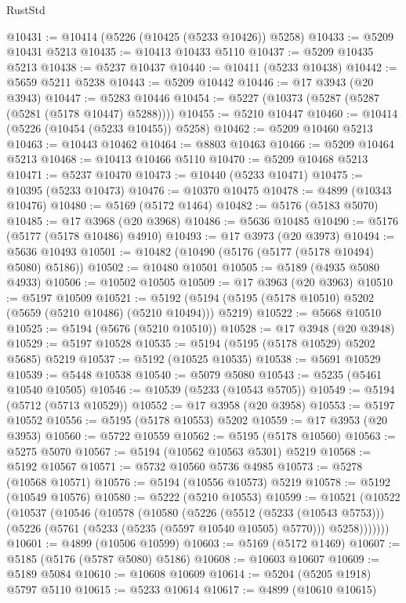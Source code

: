 \begin{lexlean}{RustStd}
\begin{coremodule}
@10431 := @10414 (@5226 (@10425 (@5233 @10426)) @5258)
@10433 := @5209 @10431 @5213
@10435 := @10413 @10433 @5110
@10437 := @5209 @10435 @5213
@10438 := @5237 @10437
@10440 := @10411 (@5233 @10438)
@10442 := @5659 @5211 @5238
@10443 := @5209 @10442
@10446 := @17 @3943 (@20 @3943)
@10447 := @5283 @10446
@10454 := @5227 (@10373 (@5287 (@5287 (@5281 (@5178 @10447) @5288))))
@10455 := @5210 @10447
@10460 := @10414 (@5226 (@10454 (@5233 @10455)) @5258)
@10462 := @5209 @10460 @5213
@10463 := @10443 @10462
@10464 := @8803 @10463
@10466 := @5209 @10464 @5213
@10468 := @10413 @10466 @5110
@10470 := @5209 @10468 @5213
@10471 := @5237 @10470
@10473 := @10440 (@5233 @10471)
@10475 := @10395 (@5233 @10473)
@10476 := @10370 @10475
@10478 := @4899 (@10343 @10476)
@10480 := @5169 (@5172 @1464)
@10482 := @5176 (@5183 @5070)
@10485 := @17 @3968 (@20 @3968)
@10486 := @5636 @10485
@10490 := @5176 (@5177 (@5178 @10486) @4910)
@10493 := @17 @3973 (@20 @3973)
@10494 := @5636 @10493
@10501 := @10482 (@10490 (@5176 (@5177 (@5178 @10494) @5080) @5186))
@10502 := @10480 @10501
@10505 := @5189 (@4935 @5080 @4933)
@10506 := @10502 @10505
@10509 := @17 @3963 (@20 @3963)
@10510 := @5197 @10509
@10521 := @5192 (@5194 (@5195 (@5178 @10510) @5202 (@5659 (@5210 @10486) (@5210 @10494))) @5219)
@10522 := @5668 @10510
@10525 := @5194 (@5676 (@5210 @10510))
@10528 := @17 @3948 (@20 @3948)
@10529 := @5197 @10528
@10535 := @5194 (@5195 (@5178 @10529) @5202 @5685) @5219
@10537 := @5192 (@10525 @10535)
@10538 := @5691 @10529
@10539 := @5448 @10538
@10540 := @5079 @5080
@10543 := @5235 (@5461 @10540 @10505)
@10546 := @10539 (@5233 (@10543 @5705))
@10549 := @5194 (@5712 (@5713 @10529))
@10552 := @17 @3958 (@20 @3958)
@10553 := @5197 @10552
@10556 := @5195 (@5178 @10553) @5202
@10559 := @17 @3953 (@20 @3953)
@10560 := @5722 @10559
@10562 := @5195 (@5178 @10560)
@10563 := @5275 @5070
@10567 := @5194 (@10562 @10563 @5301) @5219
@10568 := @5192 @10567
@10571 := @5732 @10560 @5736 @4985
@10573 := @5278 (@10568 @10571)
@10576 := @5194 (@10556 @10573) @5219
@10578 := @5192 (@10549 @10576)
@10580 := @5222 (@5210 @10553)
@10599 := @10521
    (@10522
      (@10537
        (@10546
          (@10578
            (@10580
              (@5226
                (@5512 (@5233 (@10543 @5753)))
                (@5226 (@5761 (@5233 (@5235 (@5597 @10540 @10505) @5770))) @5258)))))))
@10601 := @4899 (@10506 @10599)
@10603 := @5169 (@5172 @1469)
@10607 := @5185 (@5176 (@5787 @5080) @5186)
@10608 := @10603 @10607
@10609 := @5189 @5084
@10610 := @10608 @10609
@10614 := @5204 (@5205 @1918) @5797 @5110
@10615 := @5233 @10614
@10617 := @4899 (@10610 @10615)

\end{coremodule}
\end{lexlean}
